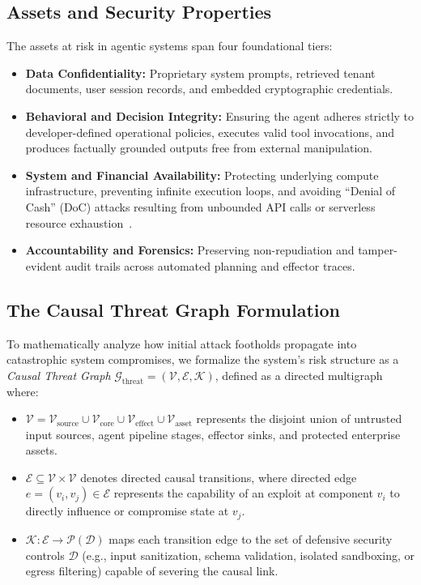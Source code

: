 \subsection{Assets and Security Properties}
\label{subsec:assets_cia}

The assets at risk in agentic systems span four foundational tiers:
\begin{itemize}
    \item \textbf{Data Confidentiality:} Proprietary system prompts, retrieved tenant documents, user session records, and embedded cryptographic credentials.
    \item \textbf{Behavioral and Decision Integrity:} Ensuring the agent adheres strictly to developer-defined operational policies, executes valid tool invocations, and produces factually grounded outputs free from external manipulation.
    \item \textbf{System and Financial Availability:} Protecting underlying compute infrastructure, preventing infinite execution loops, and avoiding ``Denial of Cash'' (DoC) attacks resulting from unbounded API calls or serverless resource exhaustion~\cite{owasp2025top10, promptfoo2025owasp}.
    \item \textbf{Accountability and Forensics:} Preserving non-repudiation and tamper-evident audit trails across automated planning and effector traces.
\end{itemize}

\subsection{The Causal Threat Graph Formulation}
\label{subsec:causal_graph}

To mathematically analyze how initial attack footholds propagate into catastrophic system compromises, we formalize the system's risk structure as a \textit{Causal Threat Graph} $\mathcal{G}_{\text{threat}} = (\mathcal{V}, \mathcal{E}, \mathcal{K})$, defined as a directed multigraph where:
\begin{itemize}
    \item $\mathcal{V} = \mathcal{V}_{\text{source}} \cup \mathcal{V}_{\text{core}} \cup \mathcal{V}_{\text{effect}} \cup \mathcal{V}_{\text{asset}}$ represents the disjoint union of untrusted input sources, agent pipeline stages, effector sinks, and protected enterprise assets.
    \item $\mathcal{E} \subseteq \mathcal{V} \times \mathcal{V}$ denotes directed causal transitions, where directed edge $e = (v_i, v_j) \in \mathcal{E}$ represents the capability of an exploit at component $v_i$ to directly influence or compromise state at $v_j$.
    \item $\mathcal{K}: \mathcal{E} \to \mathcal{P}(\mathcal{D})$ maps each transition edge to the set of defensive security controls $\mathcal{D}$ (e.g., input sanitization, schema validation, isolated sandboxing, or egress filtering) capable of severing the causal link.
\end{itemize}

